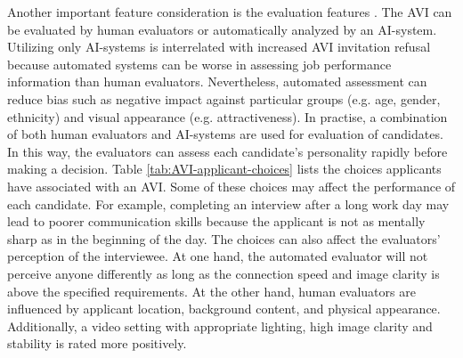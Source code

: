 Another important feature consideration is the evaluation features \cite{video-interview1-LUKACIK2022100789}. The AVI can be evaluated by human evaluators or automatically analyzed by an AI-system. Utilizing only AI-systems is interrelated with increased AVI invitation refusal because automated systems can be worse in assessing job performance information than human evaluators. Nevertheless, automated assessment can reduce bias such as negative impact against particular groups (e.g. age, gender, ethnicity) and visual appearance (e.g. attractiveness). In practise, a combination of both human evaluators and AI-systems are used for evaluation of candidates. In this way, the evaluators can assess each candidate's personality rapidly before making a decision. Table \ref{tab:AVI-applicant-choices} lists the choices applicants have associated with an AVI. Some of these choices may affect the performance of each candidate. For example, completing an interview after a long work day may lead to poorer communication skills because the applicant is not as mentally sharp as in the beginning of the day. The choices can also affect the evaluators' perception of the interviewee. At one hand, the automated evaluator will not perceive anyone differently as long as the connection speed and image clarity is above the specified requirements. At the other hand, human evaluators are influenced by applicant location, background content, and physical appearance. Additionally, a video setting with appropriate lighting, high image clarity and stability is rated more positively. 
%
